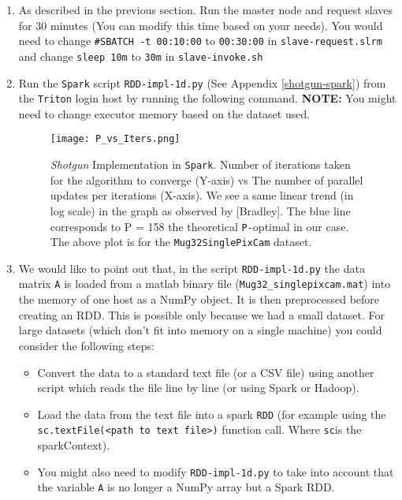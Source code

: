 \documentclass[a4paper,11pt]{article}
\begin{document}
\begin{enumerate}
    \item As described in the previous section. Run the master node and request slaves for 30 minutes (You can modify this time based on your needs). You would need to change \verb|#|\texttt{SBATCH -t 00:10:00} to \texttt{00:30:00} in \texttt{slave-request.slrm} and change \texttt{sleep 10m} to \texttt{30m} in \texttt{slave-invoke.sh}
    \item Run the \texttt{Spark} script \texttt{RDD-impl-1d.py} (See Appendix \ref{shotgun-spark}) from the \texttt{Triton} login host by running the following command. \textbf{NOTE:} You might need to change executor memory based on the dataset used.


\begin{figure}[ht]
  \centering
    \texttt{[image: P\_vs\_Iters.png]}
    \caption{\textit{Shotgun} Implementation in \texttt{Spark}. Number of iterations taken for the algorithm to converge (Y-axis) vs The number of parallel updates per iterations (X-axis). We see a same linear trend (in log scale) in the graph as observed by [Bradley]. The blue line corresponds to P = 158 the theoretical \texttt{P-}optimal in our case. The above plot is for the \texttt{Mug32SinglePixCam} dataset.}
    \label{fig:1}
\end{figure}

\item \label{bigdata} We would like to point out that, in the script \texttt{RDD-impl-1d.py} the data matrix \texttt{A} is loaded from a matlab binary file (\texttt{Mug32\_singlepixcam.mat}) into the memory of one host as a NumPy object. It is then preprocessed before creating an RDD. This is possible only because we had a small dataset. For large datasets (which don't fit into memory on a single machine) you could consider the following steps:
    \begin{itemize}
        \item Convert the data to a standard text file (or a CSV file) using another script which reads the file line by line (or using Spark or Hadoop).
        \item Load the data from the text file into a spark \texttt{RDD} (for example using the \texttt{sc.textFile(<path to text file>)} function call. Where \texttt{sc}is the sparkContext).
        \item You might also need to modify \texttt{RDD-impl-1d.py} to take into account that the variable \texttt{A} is no longer a NumPy array but a Spark RDD.
    \end{itemize}
\end{enumerate}
\end{document}
